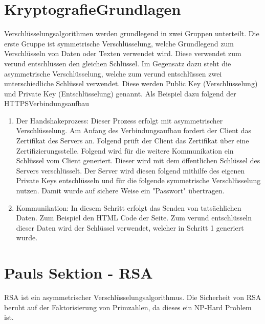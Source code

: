 \section{Kryptografie\textendash Grundlagen}
Verschlüsselungsalgorithmen werden grundlegend in zwei Gruppen unterteilt.
Die erste Gruppe ist symmetrische Verschlüsselung, welche Grundlegend zum Verschlüsseln von Daten
oder Texten verwendet wird. Diese verwendet zum ver\textendash und entschlüssen den gleichen Schlüssel.
Im Gegensatz dazu steht die asymmetrische Verschlüsselung, welche zum ver\textendash und entschlüssen
zwei unterschiedliche Schlüssel verwendet. Diese werden Public Key (Verschlüsselung) und 
Private Key (Entschlüsselung) genannt. Als Beispiel dazu folgend der HTTPS\textendash Verbindungsaufbau
\begin{enumerate}
    \item Der Handshakeprozess: Dieser Prozess erfolgt mit asymmetrischer Verschlüsselung. 
    Am Anfang des Verbindungsaufbau fordert der Client
    das Zertifikat des Servers an. Folgend prüft der Client das Zertifikat über eine Zertifizierungsstelle.
    Folgend wird für die weitere Kommunikation ein Schlüssel vom Client generiert. Dieser wird
    mit dem öffentlichen Schlüssel des Servers verschlüsselt. Der Server wird diesen folgend mithilfe des 
    eigenen Private Keys entschlüsseln und für die folgende symmetrische Verschlüsselung nutzen. Damit
    wurde auf sichere Weise ein "Passwort" übertragen.
    \item Kommunikation: In diesem Schritt erfolgt das Senden von tatsächlichen Daten. Zum Beispiel den
    HTML Code der Seite. Zum ver\textendash und entschlüsseln dieser Daten wird der Schlüssel verwendet,
    welcher in Schritt 1 generiert wurde.
\end{enumerate}
\section{Pauls Sektion - RSA}
RSA ist ein asymmetrischer Verschlüsselungsalgorithmus. Die Sicherheit von RSA beruht
auf der Faktorisierung von Primzahlen, da dieses ein NP-Hard Problem ist\cite{moolchad_leveraging_nodate}.


 